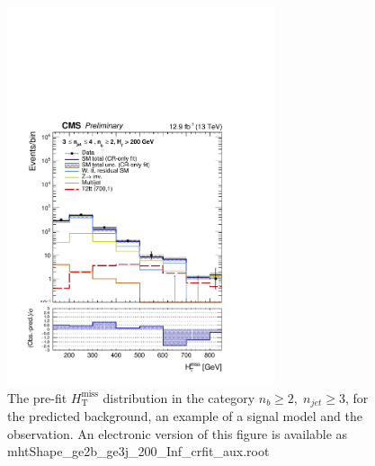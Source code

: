 \clearpage
\begin{figure}[tbhp]
    \caption{ 
    The pre-fit $H_{\mathrm{T}}^{\mathrm{miss}}$ distribution in the category $n_{b}\geq 2, \; n_{jet} \geq 3$, 
    for the predicted background, an example of a signal model and the observation.
    An electronic version of this figure is available as mhtShape\_ge2b\_ge3j\_200\_Inf\_crfit\_aux.root
    \label{fig:mhtShape_ge2b_ge3j_crfit} }
  \begin{center}
  \includegraphics[width=0.7\textwidth]{mhtShape_ge2b_ge3j_200_Inf_crfit_aux}
  \end{center}
\end{figure}


